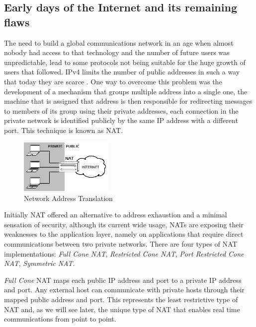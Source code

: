 \subsection{Early days of the Internet and its remaining flaws}\label{early}

The need to build a global communications network in an age when almost nobody had access to that technology and the number of future users was unpredictable, lead to some protocols not being suitable for the huge growth of users that followed. \ac{IPv4} limits the number of public addresses in such a way that today they are scarce \cite{ipv4}. One way to overcome this problem was the development of a mechanism that groups multiple address into a single one, the machine that is assigned that address is then responsible for redirecting messages to members of its group using their private addresses, each connection in the private network is identified publicly by the same \ac{IP} address with a different port.
This technique is known as \ac{NAT}.

\begin{figure}[H]
	\centering
	\includegraphics[width=0.4\textwidth]{figures/nat.png}
	\caption{Network Address Translation}
\end{figure}

Initially \ac{NAT} offered an alternative to address exhaustion and a minimal sensation of security, although its current wide usage, \ac{NAT}s are exposing their weaknesses to the application layer, {\color{blue}namely on applications that require direct communications between two private networks.}
There are four types of \ac{NAT} implementations\cite{rfc3489}: \emph{Full Cone NAT}, \emph{Restricted Cone NAT}, \emph{Port Restricted Cone NAT}, \emph{Symmetric NAT}.

\emph{Full Cone} \ac{NAT} maps each public \ac{IP} address and port to a private \ac{IP} address and port.
Any external host can communicate with private hosts through their mapped public address and port. This represents the least restrictive type of \ac{NAT} and, as we will see later, the unique type of \ac{NAT} that enables real time communications from point to point.

